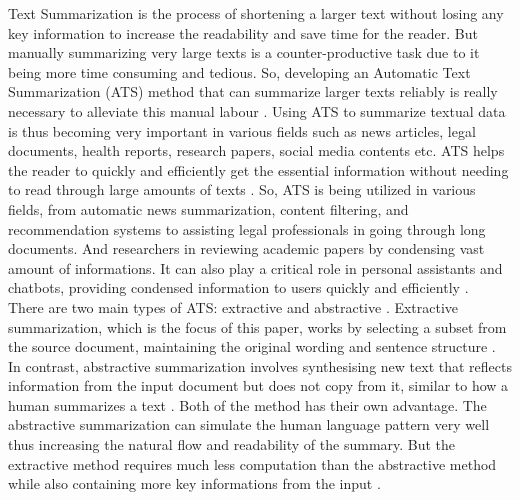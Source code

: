 Text Summarization is the process of shortening a larger text without losing any key information to increase the readability and save time for the reader. But manually summarizing very large texts is a counter-productive task due to it being more time consuming and tedious. So, developing an Automatic Text Summarization (ATS) method that can summarize larger texts reliably is really necessary to alleviate this manual labour \cite{Widyassari-2022-rev-ats-tech-met}. 
Using ATS to summarize textual data is thus becoming very important in various fields such as news articles, legal documents, health reports, research papers, social media contents etc. ATS helps the reader to quickly and efficiently get the essential information without needing to read through large amounts of texts \cite{wafaa-2021-summary-comprehensive-review}. So, ATS is being utilized in various fields, from automatic news summarization, content filtering, and recommendation systems to assisting legal professionals in going through long documents. And researchers in reviewing academic papers by condensing vast amount of informations. It can also play a critical role in personal assistants and chatbots, providing condensed information to users quickly and efficiently \cite{tas-2017-rev-text-sum-2}.\\

There are two main types of ATS: extractive and abstractive \cite{tas-2017-rev-text-sum-2}. Extractive summarization, which is the focus of this paper, works by selecting a subset from the source document, maintaining the original wording and sentence structure \cite{moratanch-2017-extractive-review}. In contrast, abstractive summarization involves synthesising new text that reflects information from the input document but does not copy from it, similar to how a human summarizes a text \cite{Moratanch-2016-abstractive-rev}. Both of the method has their own advantage. The abstractive summarization can simulate the human language pattern very well thus increasing the natural flow and readability of the summary. But the extractive method requires much less computation than the abstractive method while also containing more key informations from the input \cite{gupta-2010-extractive-rev}.\\ 

